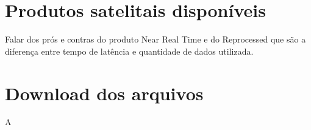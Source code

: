 \documentclass[12pt]{article}
\begin{document}
\section{Produtos satelitais disponíveis}
	\par Falar dos prós e contras do produto Near Real Time e do Reprocessed que são a diferença entre tempo de latência e quantidade de dados utilizada.

\section{Download dos arquivos}
	\par A
	

\typeout{}

\end{document}

